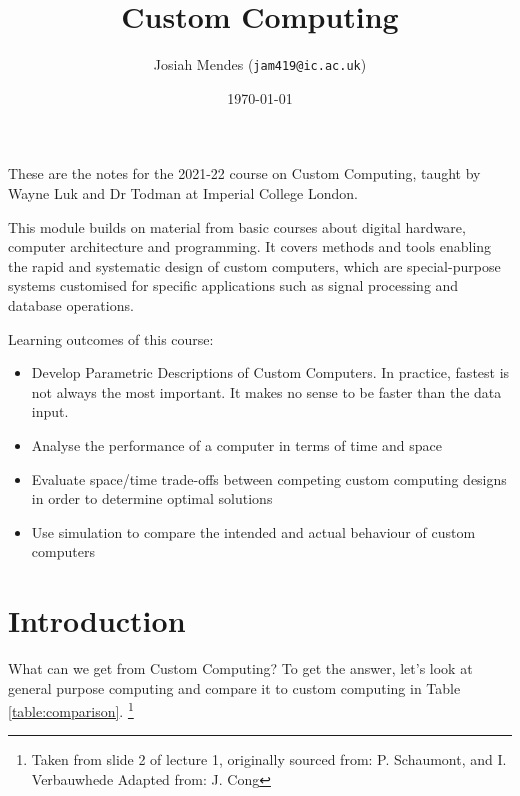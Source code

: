 \documentclass[a4paper]{scrartcl}
\title{Custom Computing}
\author{Josiah Mendes (\texttt{jam419@ic.ac.uk})}
\date{\today}
\begin{document}
\maketitle

These are the notes for the 2021-22 course on Custom Computing,
taught by Wayne Luk and Dr Todman at Imperial College London. 

This module builds on material from basic courses about digital hardware, 
computer architecture and programming. It covers methods and tools enabling the 
rapid and systematic design of custom computers, which are special-purpose systems 
customised for specific applications such as signal processing and database operations.

Learning outcomes of this course:
\begin{itemize}
    \item Develop Parametric Descriptions of Custom Computers. In practice, fastest is not always the most important. It makes no sense to be faster than the data input. 
    \item Analyse the performance of a computer in terms of time and space
    \item Evaluate space/time trade-offs between competing custom computing designs in order to determine optimal solutions
    \item Use simulation to compare the intended and actual behaviour of custom computers
\end{itemize}





\tableofcontents


\pagebreak

\section{Introduction}
What can we get from Custom Computing? To get the answer, let's look at general
purpose computing and compare it to custom computing in Table \ref{table:comparison}.
\footnote{Taken from slide 2 of lecture 1, originally sourced from: P. Schaumont, and I. Verbauwhede
Adapted from: J. Cong}
\end{document}
